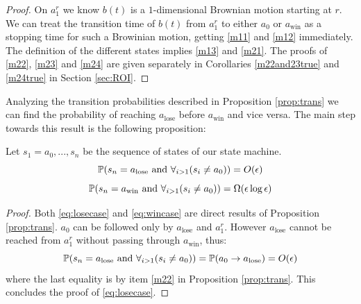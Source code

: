 {{\begin{proof}
 On $a^r_1$ we know $b(t)$ is a $1$-dimensional Brownian motion starting at $r$.
 We can treat the transition time of $b(t)$ from $a^r_1$ to either $a_0$ or
 $a_\text{win}$ as a stopping time for such a Browinian motion, getting
 \ref{m11} and \ref{m12} immediately. The definition of the different states
 implies \ref{m13} and \ref{m21}. The proofs of \ref{m22}, \ref{m23} and \ref{m24}
 are given separately in Corollaries \ref{m22and23true} and \ref{m24true} in Section \ref{sec:ROI}.
\end{proof}

Analyzing the transition probabilities described in Proposition \ref{prop:trans} we
can find the probability of reaching $a_\text{lose}$ before $a_\text{win}$ and vice versa.
 The main step towards this result is the following proposition:

\begin{propos}\label{prop:winlose1}
Let $s_1=a_0,...,s_n$ be the sequence of states of our state machine.
\begin{equation}\label{eq:losecase}
\mathbb{P}(s_n=a_\text{lose} \text{ and } \displaystyle\forall_{i>1}(s_i\neq a_0))=O(\epsilon)
\end{equation}
\begin{equation}\label{eq:wincase}
\mathbb{P}(s_n=a_\text{win} \text{ and } \displaystyle\forall_{i>1}(s_i\neq a_0))=\Omega(\epsilon\log\epsilon)
\end{equation}
\end{propos}

\begin{proof}
Both \eqref{eq:losecase} and \eqref{eq:wincase} are direct results of Proposition \ref{prop:trans}.
 $a_0$ can be followed only by $a_\text{lose}$ and $a_1^r$. However $a_\text{lose}$ cannot be
 reached from $a_1^r$ without passing through
 $a_\text{win}$, thus:
 $$\mathbb{P}(s_n=a_\text{lose} \text{ and } \displaystyle\forall_{i>1}(s_i\neq a_0))=\mathbb{P}(a_0\rightarrow a_\text{lose})=O(\epsilon)$$
 where the last equality is by item \ref{m22} in Proposition \ref{prop:trans}.
 This concludes the proof of \eqref{eq:losecase}.


\end{proof}}}
